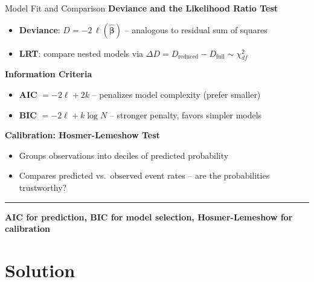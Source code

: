\documentclass[8pt,aspectratio=169]{beamer}
\newcommand{\bottomnote}[1]{%
\vfill
\vspace{-2mm}
\textcolor{mllavender2}{\rule{\textwidth}{0.4pt}}
\vspace{1mm}
\footnotesize
\textbf{#1}
}
\begin{document}
\begin{frame}[t]{Model Fit and Comparison}
\textbf{Deviance and the Likelihood Ratio Test}
\begin{itemize}
  \item \textbf{Deviance}: $D = -2\,\ell(\boldsymbol{\hat\beta})$ -- analogous to residual sum of squares
  \item \textbf{LRT}: compare nested models via $\Delta D = D_{\text{reduced}} - D_{\text{full}} \sim \chi^2_{df}$
\end{itemize}

\vspace{0.5em}
\textbf{Information Criteria}
\begin{itemize}
  \item \textbf{AIC} $= -2\ell + 2k$ -- penalizes model complexity (prefer smaller)
  \item \textbf{BIC} $= -2\ell + k\log N$ -- stronger penalty, favors simpler models
\end{itemize}

\vspace{0.5em}
\textbf{Calibration: Hosmer-Lemeshow Test}
\begin{itemize}
  \item Groups observations into deciles of predicted probability
  \item Compares predicted vs.\ observed event rates -- are the probabilities trustworthy?
\end{itemize}
\bottomnote{AIC for prediction, BIC for model selection, Hosmer-Lemeshow for calibration}
\end{frame}

\section{Solution}
\end{document}
